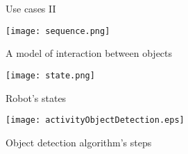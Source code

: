             \begin{figure}[h!]
        \centering
        \hfil 
         \renewcommand\thefigure{B.2}
        \caption{ Use cases II}
        \label{useCases2}
      \end{figure}





\begin{figure}[!ht]
\renewcommand\thefigure{B.3}
\centering
\texttt{[image: sequence.png]}
\caption{A model of interaction between objects}\label{sequence}
\end{figure}

\begin{figure}[!hb]
\renewcommand\thefigure{B.4}
\centering
\texttt{[image: state.png]}
\caption{Robot's states}\label{state}
\end{figure}

\begin{figure}[!ht]
\renewcommand\thefigure{B.5}
\centering
\texttt{[image: activityObjectDetection.eps]}
\caption{Object detection algorithm's steps}\label{activity1}
\end{figure}

